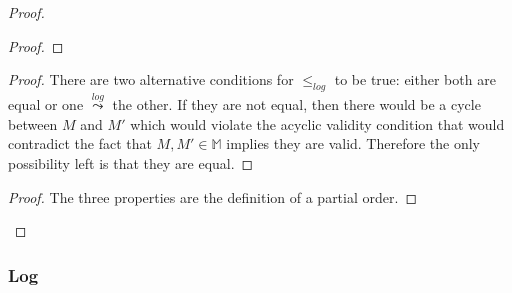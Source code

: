 \documentclass[9pt, oneside]{article}   	%
\newcommand{\logleadsto}{\overset{\textit{log}}\leadsto}
\begin{document}
\begin{proof}
\begin{proof}
	\end{proof}
	
	\begin{proof}
		There are two alternative conditions for $\leq_\textit{log}$ to be true: either both are equal or one $\logleadsto$ the other. If they are not equal, then there would be a cycle between $M$ and $M'$ which would violate the acyclic validity condition that would contradict the fact that $M,M' \in \mathds{M}$ implies they are valid. Therefore the only possibility left is that they are equal.
	\end{proof}
	
	\qedstep{}
	\begin{proof}
		The three properties are the definition of a partial order.
	\end{proof}
\end{proof}

\subsubsection{Log}
\label{sec:proofs:convergence:log}

\end{document}
